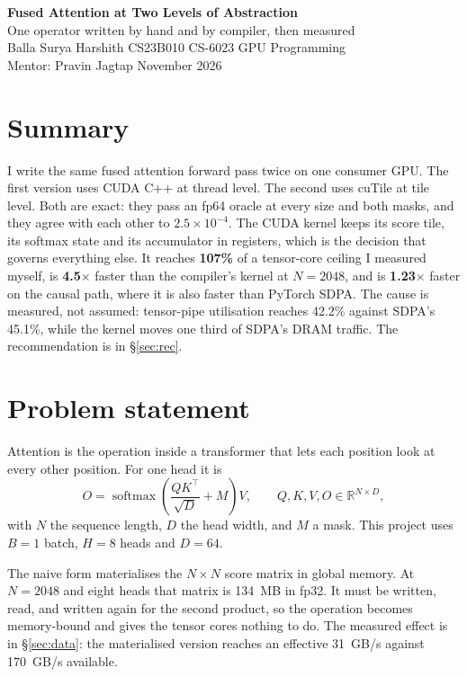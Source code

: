 \documentclass[10pt,a4paper]{article}
\begin{document}
\begin{center}
{\LARGE\bfseries Fused Attention at Two Levels of Abstraction}\\[3pt]
{\large One operator written by hand and by compiler, then measured}\\[7pt]
Balla Surya Harshith \quad CS23B010 \quad CS-6023 GPU Programming\\
Mentor: Pravin Jagtap  November 2026
\end{center}

\vspace{-6pt}
\section*{Summary}
I write the same fused attention forward pass twice on one consumer GPU. The first version uses CUDA
C++ at thread level. The second uses cuTile at tile level. Both are exact: they pass an fp64 oracle at
every size and both masks, and they agree with each other to $2.5\times10^{-4}$. The CUDA kernel keeps
its score tile, its softmax state and its accumulator in registers, which is the decision that governs
everything else. It reaches \textbf{107\%} of a tensor-core ceiling I measured myself, is
\textbf{4.5$\times$} faster than the compiler's kernel at $N{=}2048$, and is \textbf{1.23$\times$}
faster on the causal path, where it is also faster than PyTorch SDPA. The cause is measured, not
assumed: tensor-pipe utilisation reaches 42.2\% against SDPA's 45.1\%, while the kernel moves one third
of SDPA's DRAM traffic. The recommendation is in \S\ref{sec:rec}.

\section{Problem statement}

Attention is the operation inside a transformer that lets each position look at every other position.
For one head it is
\begin{equation}
O = \operatorname{softmax}\!\left(\frac{QK^{\top}}{\sqrt{D}} + M\right)V,
\qquad Q,K,V,O \in \mathbb{R}^{N\times D},
\label{eq:attn}
\end{equation}
with $N$ the sequence length, $D$ the head width, and $M$ a mask. This project uses
$B{=}1$ batch, $H{=}8$ heads and $D{=}64$.

The naive form materialises the $N\times N$ score matrix in global memory. At $N{=}2048$ and eight
heads that matrix is \SI{134}{MB} in fp32. It must be written, read, and written again for the second
product, so the operation becomes memory-bound and gives the tensor cores nothing to do. The measured
effect is in \S\ref{sec:data}: the materialised version reaches an effective \SI{31}{GB/s} against
\SI{170}{GB/s} available.
\end{document}
